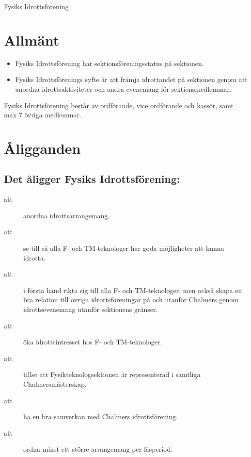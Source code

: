 \documentclass[a4paper]{article}
\begin{document}
\renewcommand{\forening}{Fysiks Idrottsförening} %

\begin{foreningenv}{\forening{}} %
    \section{Allmänt}
    \begin{itemize}
        \item Fysiks Idrottsförening har sektionsföreningsstatus på sektionen.
        \item Fysiks Idrottsförenings syfte är att främja idrottandet på sektionen genom att anordna idrottsaktiviteter och andra evenemang för sektionsmedlemmar.
    \end{itemize}
    
    Fysiks Idrottsförening består av ordförande, vice ordförande och kassör, samt max 7 övriga medlemmar.
    
    \section{Åligganden}
    \aliggsektfunkt{}
    
    \subsection{Det åligger Fysiks Idrottsförening:}
    \begin{description}
        \item[att] anordna idrottsarrangemang.
        \item[att] se till så alla F- och TM-teknologer har goda möjligheter att kunna idrotta.
        \item[att] i första hand rikta sig till alla F- och TM-teknologer, men också skapa en bra relation till övriga idrottsföreningar på och utanför Chalmers genom idrottsevenemang utanför sektionens gränser.
        \item[att] öka idrottsintresset hos F- och TM-teknologer.
        \item[att] tillse att Fysikteknologsektionen är representerad i samtliga Chalmersmästerskap.
        \item[att] ha en bra samverkan med Chalmers idrottsförening.
        \item[att] ordna minst ett större arrangemang per läsperiod.
    \end{description}
    

\end{foreningenv}
\end{document}
